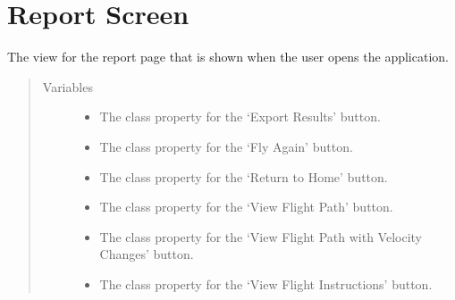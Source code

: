 \documentclass[letterpaper,10pt,english]{sphinxmanual}
\begin{document}
\chapter{Report Screen}
\label{\detokenize{index:module-src.Views.View_ReportScreen}}\label{\detokenize{index:report-screen}}

\begin{fulllineitems}
\label{\detokenize{index:src.Views.View_ReportScreen.ReportWindow}}
The view for the report page that is shown when the user opens the application.
\begin{quote}\begin{description}
\item[{Variables}] \leavevmode\begin{itemize}
\item {} 
 \textendash{} The class property for the ‘Export Results’ button.

\item {} 
 \textendash{} The class property for the ‘Fly Again’ button.

\item {} 
 \textendash{} The class property for the ‘Return to Home’ button.

\item {} 
 \textendash{} The class property for the ‘View Flight Path’ button.

\item {} 
 \textendash{} The class property for the ‘View Flight Path with Velocity Changes’ button.

\item {} 
 \textendash{} The class property for the ‘View Flight Instructions’ button.


\end{itemize}
\end{description}
\end{quote}
\end{fulllineitems}
\end{document}
